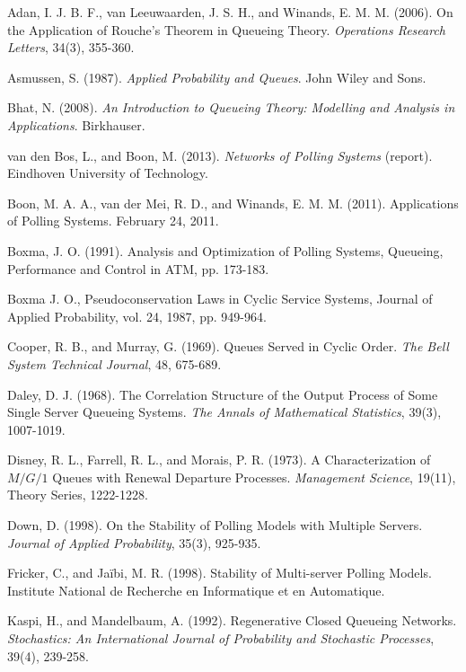 \begin{thebibliography}{99}

 Adan, I. J. B. F., van Leeuwaarden, J. S. H., and Winands, E. M. M. (2006). On the Application of Rouche’s Theorem in Queueing Theory. \textit{Operations Research Letters}, 34(3), 355-360.

 Asmussen, S. (1987). \textit{Applied Probability and Queues}. John Wiley and Sons.

 Bhat, N. (2008). \textit{An Introduction to Queueing Theory: Modelling and Analysis in Applications}. Birkhauser.

 van den Bos, L., and Boon, M. (2013). \textit{Networks of Polling Systems} (report). Eindhoven University of Technology.

 Boon, M. A. A., van der Mei, R. D., and Winands, E. M. M. (2011). Applications of Polling Systems. February 24, 2011.

 Boxma, J. O. (1991). Analysis and Optimization of Polling Systems, Queueing, Performance and Control in ATM, pp. 173-183.

 Boxma J. O., Pseudoconservation Laws in Cyclic Service Systems, Journal of Applied Probability, vol. 24, 1987, pp. 949-964.

 Cooper, R. B., and Murray, G. (1969). Queues Served in Cyclic Order. \textit{The Bell System Technical Journal}, 48, 675-689.

 Daley, D. J. (1968). The Correlation Structure of the Output Process of Some Single Server Queueing Systems. \textit{The Annals of Mathematical Statistics}, 39(3), 1007-1019.

 Disney, R. L., Farrell, R. L., and Morais, P. R. (1973). A Characterization of $M/G/1$ Queues with Renewal Departure Processes. \textit{Management Science}, 19(11), Theory Series, 1222-1228.

 Down, D. (1998). On the Stability of Polling Models with Multiple Servers. \textit{Journal of Applied Probability}, 35(3), 925-935.

 Fricker, C., and Jaïbi, M. R. (1998). Stability of Multi-server Polling Models. Institute National de Recherche en Informatique et en Automatique.


 Kaspi, H., and Mandelbaum, A. (1992). Regenerative Closed Queueing Networks. \textit{Stochastics: An International Journal of Probability and Stochastic Processes}, 39(4), 239-258.


\end{thebibliography}
